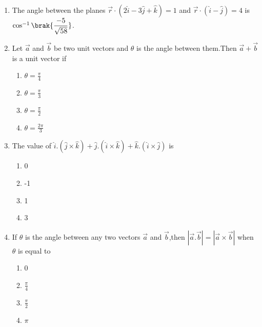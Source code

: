 \begin{enumerate}[label=\thesection.\arabic*,ref=\thesection.\theenumi]
\item The angle between the planes $\overrightarrow{r} \cdot (2\hat{i}-3\hat{j}+\hat{k})=1$ and $\overrightarrow{r} \cdot (\hat{i}-\hat{j})=4$ is $\cos^{-1} \brak{\dfrac{-5}{\sqrt{58}}}$.
\item Let $\vec{a}$ and $\vec{b}$ be two unit vectors and $\theta$ is the angle between them.Then $\vec{a}+\vec{b}$ is a unit vector if
\begin{enumerate}
\item $\theta=\frac{\pi}{4}$
\item $\theta=\frac{\pi}{3}$
\item $\theta=\frac{\pi}{2}$
\item $\theta=\frac{2\pi}{3}$
\end{enumerate}
\item The value of $\hat{i}.(\hat{j}\times\hat{k})+\hat{j}.(\hat{i}\times\hat{k})+\hat{k}.(\hat{i}\times\hat{j})$ is
\begin{enumerate}
\item 0
\item -1
\item 1
\item 3
\end{enumerate}
\item If $\theta$ is the angle between any two vectors $\vec{a}$ and $\vec{b}$,then $|\vec{a}.\vec{b}|=|\vec{a}\times\vec{b}|$ when $\theta$ is equal to
\begin{enumerate}
\item 0
\item $\frac{\pi}{4}$
\item $\frac{\pi}{2}$
\item $\pi$
\end{enumerate}

\end{enumerate}
